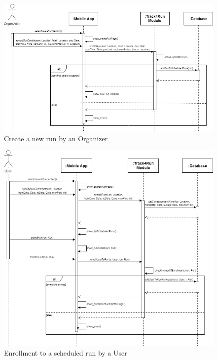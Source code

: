 
\begin{figure}[H]
    \centering
    \includegraphics[scale=0.35]{DD/Pictures/createRunSeqDiagDD.png}
    \caption{Create a new run by an Organizer}
\end{figure}

\begin{figure}[H]
    \centering
    \includegraphics[scale=0.35]{DD/Pictures/enrollSeqDiagDD.png}
    \caption{Enrollment to a scheduled run by a User}
\end{figure}